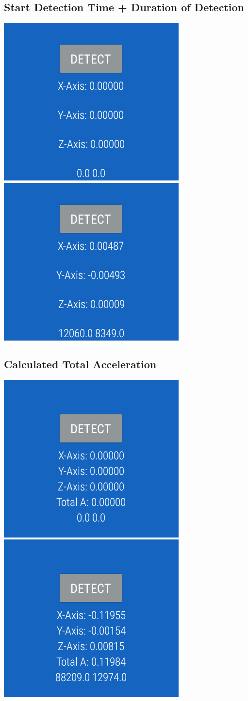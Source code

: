 \documentclass[12pt]{article}
\begin{document}
\subsection{Start Detection Time + Duration of Detection}
\begin{center}
\includegraphics[width=.4\textwidth]{bpm3.png}
\includegraphics[width=.4\textwidth]{bpm4.png}
\end{center}
\subsection{Calculated Total Acceleration}
\begin{center}
\includegraphics[width=.4\textwidth]{bpm5.png}
\includegraphics[width=.4\textwidth]{bpm6.png}
\end{center}
\end{document}
